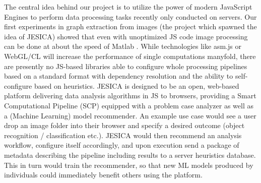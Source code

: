 \documentclass[a4paper,10pt]{article}
\begin{document}
\begin{enumerate}
The central idea behind our project is to utilize the power of modern JavaScript Engines to perform data processing tasks recently only conducted on servers. Our first experiments in graph extraction from images (the project which spawned the idea of JESICA) showed that even with unoptimized JS code image processing can be done at about the speed of Matlab \citep{GraphExtractPaper}. While technologies like asm.js or WebGL/CL will increase the performance of single computations manyfold, there are presently no JS-based libraries able to configure whole processing pipelines based on a standard format with dependency resolution and the ability to self-configure based on heuristics. JESICA is designed to be an open, web-based platform delivering data analysis algorithms in JS to browsers, providing a Smart Computational Pipeline (SCP) equipped with a problem case analyzer as well as a (Machine Learning) model recommender. An example use case would see a user drop an image folder into their browser and specify a desired outcome (object recognition / classification etc.). JESICA would then recommend an analysis workflow, configure itself accordingly, and upon execution send a package of metadata describing the pipeline including results to a server heuristics database. This in turn would train the recommender, so that new ML models produced by individuals could immediately benefit others using the platform.




\end{enumerate}
\end{document}
